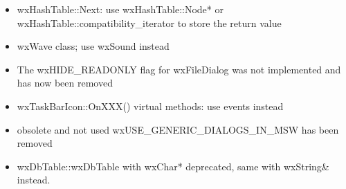 \begin{itemize}
\item wxHashTable::Next: use wxHashTable::Node* or wxHashTable::compatibility\_iterator to store the return value
\item wxWave class; use wxSound instead
\item The wxHIDE\_READONLY flag for wxFileDialog was not implemented and has now been removed
\item wxTaskBarIcon::OnXXX() virtual methods: use events instead
\item obsolete and not used wxUSE\_GENERIC\_DIALOGS\_IN\_MSW has been removed
\item wxDbTable::wxDbTable with wxChar* deprecated, same with wxString\& instead.
\end{itemize}

